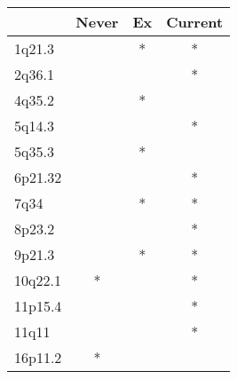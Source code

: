 \begin{tabular}{lccc}
\toprule
{} & Never & Ex & Current \\
\midrule
1q21.3  &       &  * &       * \\
2q36.1  &       &    &       * \\
4q35.2  &       &  * &         \\
5q14.3  &       &    &       * \\
5q35.3  &       &  * &         \\
6p21.32 &       &    &       * \\
7q34    &       &  * &       * \\
8p23.2  &       &    &       * \\
9p21.3  &       &  * &       * \\
10q22.1 &     * &    &       * \\
11p15.4 &       &    &       * \\
11q11   &       &    &       * \\
16p11.2 &     * &    &         \\
\bottomrule
\end{tabular}
